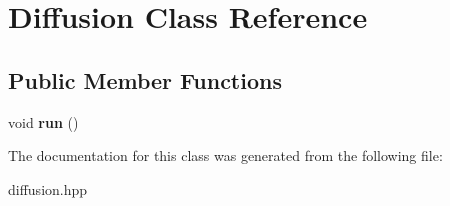 \hypertarget{classDiffusion}{\section{Diffusion Class Reference}
\label{classDiffusion}
}
\subsection*{Public Member Functions}
\begin{DoxyCompactItemize}
\item 
\hypertarget{classDiffusion_a3352aa5154c7295ad715ab970eab9ed9}{void {\bfseries run} ()}\label{classDiffusion_a3352aa5154c7295ad715ab970eab9ed9}

\end{DoxyCompactItemize}


The documentation for this class was generated from the following file\-:\begin{DoxyCompactItemize}
\item 
diffusion.\-hpp\end{DoxyCompactItemize}
